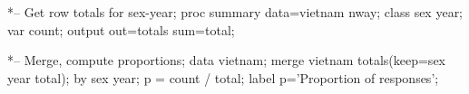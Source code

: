 \begin{listing}

*-- Get row totals for sex-year;
proc summary data=vietnam nway;
   class sex year;
   var count;
   output out=totals sum=total;

*-- Merge, compute proportions;
data vietnam;
   merge vietnam totals(keep=sex year total);
   by sex year;
   p = count / total;
   label p='Proportion of responses';
\end{listing}
